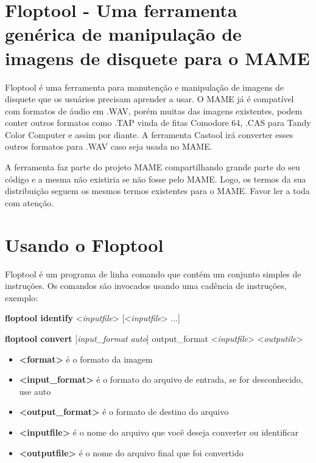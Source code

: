 \documentclass[letterpaper,10pt,brazil]{sphinxmanual}
\begin{document}
\section{Floptool - Uma ferramenta genérica de manipulação de imagens de disquete para o MAME}
\label{tools/floptool:floptool-uma-ferramenta-generica-de-manipulacao-de-imagens-de-disquete-para-o-mame}\label{tools/floptool::doc}
Floptool é uma ferramenta para manutenção e manipulação de imagens de
disquete que os usuários precisam aprender a usar. O MAME já é
compatível com formatos de áudio em .WAV, porém muitas das imagens
existentes, podem conter outros formatos como .TAP vinda de fitas
Comodore 64, .CAS para Tandy Color Computer e assim por diante.
A ferramenta Castool irá converter esses outros formatos para .WAV caso
seja usada no MAME.

A ferramenta faz parte do projeto MAME compartilhando grande parte do
seu código e a mesma não existiria se não fosse pelo MAME.
Logo, os termos da sua distribuição seguem os mesmos termos existentes
para o MAME. Favor ler a toda {\hyperref[license:mame\string-license]{}} com atenção.


\section{Usando o Floptool}
\label{tools/floptool:usando-o-floptool}
Floptool é um programa de linha comando que contém um conjunto simples
de instruções. Os comandos são invocados usando uma cadência de
instruções, exemplo:

\begin{DUlineblock}{0em}
\item[] \textbf{floptool identify} \textless{}\emph{inputfile}\textgreater{} {[}\textless{}\emph{inputfile}\textgreater{} ...{]}
\item[] \textbf{floptool convert} {[}\emph{input\_format} \textbar{} \emph{auto}{]} output\_format \textless{}\emph{inputfile}\textgreater{} \textless{}\emph{outputile}\textgreater{}
\end{DUlineblock}
\begin{itemize}
\item {} 
\textbf{\textless{}format\textgreater{}} é o formato da imagem

\item {} 
\textbf{\textless{}input\_format\textgreater{}} é o formato do arquivo de entrada, se for desconhecido, use auto

\item {} 
\textbf{\textless{}output\_format\textgreater{}} é o formato de destino do arquivo

\item {} 
\textbf{\textless{}inputfile\textgreater{}} é o nome do arquivo que você deseja converter ou identificar

\item {} 
\textbf{\textless{}outputfile\textgreater{}} é o nome do arquivo final que foi convertido

\end{itemize}
\end{document}
